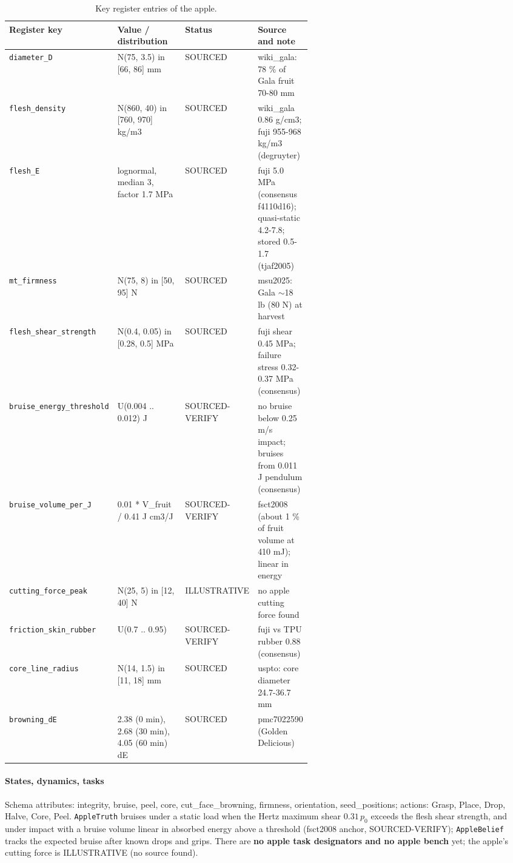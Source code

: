\documentclass[10.5pt,a4paper]{article}
\begin{document}
\begin{table}[htbp]\centering\scriptsize\caption{Key register entries of the apple.}
\begin{tabularx}{\linewidth}{@{}p{0.19\linewidth}p{0.27\linewidth}p{0.12\linewidth}X@{}}\toprule Register key & Value / distribution & Status & Source and note \\\midrule
\texttt{diameter\_\allowbreak{}D} & N(75, 3.5) in [66, 86] mm & SOURCED & wiki\_gala: 78 \% of Gala fruit 70-80 mm \\
\texttt{flesh\_\allowbreak{}density} & N(860, 40) in [760, 970] kg/m3 & SOURCED & wiki\_gala 0.86 g/cm3; fuji 955-968 kg/m3 (degruyter) \\
\texttt{flesh\_\allowbreak{}E} & lognormal, median 3, factor 1.7 MPa & SOURCED & fuji 5.0 MPa (consensus f4110d16); quasi-static 4.2-7.8; stored 0.5-1.7 (tjaf2005) \\
\texttt{mt\_\allowbreak{}firmness} & N(75, 8) in [50, 95] N & SOURCED & msu2025: Gala $\sim$18 lb (80 N) at harvest \\
\texttt{flesh\_\allowbreak{}shear\_\allowbreak{}strength} & N(0.4, 0.05) in [0.28, 0.5] MPa & SOURCED & fuji shear 0.45 MPa; failure stress 0.32-0.37 MPa (consensus) \\
\texttt{bruise\_\allowbreak{}energy\_\allowbreak{}threshold} & U(0.004 .. 0.012) J & SOURCED-VERIFY & no bruise below 0.25 m/s impact; bruises from 0.011 J pendulum (consensus) \\
\texttt{bruise\_\allowbreak{}volume\_\allowbreak{}per\_\allowbreak{}J} & 0.01 * V\_fruit / 0.41 J cm3/J & SOURCED-VERIFY & fsct2008 (about 1 \% of fruit volume at 410 mJ); linear in energy \\
\texttt{cutting\_\allowbreak{}force\_\allowbreak{}peak} & N(25, 5) in [12, 40] N & ILLUSTRATIVE & no apple cutting force found \\
\texttt{friction\_\allowbreak{}skin\_\allowbreak{}rubber} & U(0.7 .. 0.95) & SOURCED-VERIFY & fuji vs TPU rubber 0.88 (consensus) \\
\texttt{core\_\allowbreak{}line\_\allowbreak{}radius} & N(14, 1.5) in [11, 18] mm & SOURCED & uspto: core diameter 24.7-36.7 mm \\
\texttt{browning\_\allowbreak{}dE} & 2.38 (0 min), 2.68 (30 min), 4.05 (60 min) dE & SOURCED & pmc7022590 (Golden Delicious) \\\bottomrule\end{tabularx}\end{table}
\paragraph{States, dynamics, tasks} Schema attributes: integrity, bruise, peel, core, cut\_face\_browning, firmness, orientation, seed\_positions; actions: Grasp, Place, Drop, Halve, Core, Peel. \texttt{AppleTruth} bruises under a static load when the Hertz
maximum shear $0.31\,p_0$ exceeds the flesh shear strength, and under impact with a bruise volume linear in absorbed
energy above a threshold (fsct2008 anchor, SOURCED-VERIFY); \texttt{AppleBelief} tracks the expected bruise after
known drops and grips. There are \textbf{no apple task designators and no apple bench} yet; the apple's cutting force
is ILLUSTRATIVE (no source found).
\end{document}
